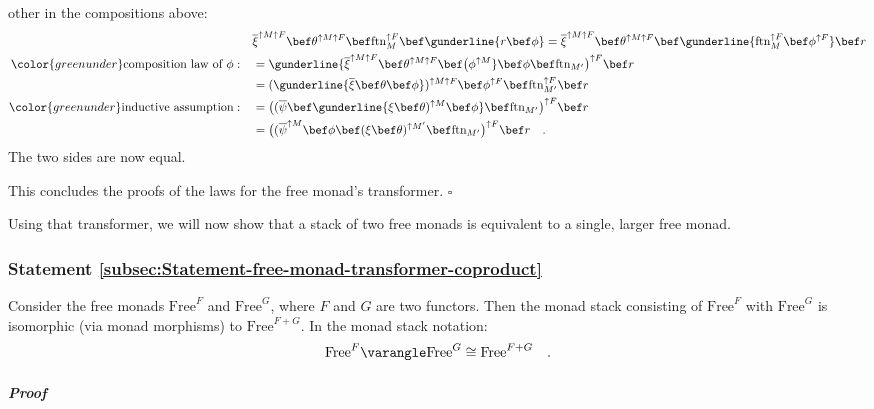 other in the compositions above:
\begin{align*}
 & \overline{\xi}^{\uparrow M\uparrow F}\bef\theta^{\uparrow M\uparrow F}\bef\text{ftn}_{M}^{\uparrow F}\bef\gunderline{r\bef\phi}=\overline{\xi}^{\uparrow M\uparrow F}\bef\theta^{\uparrow M\uparrow F}\bef\gunderline{\text{ftn}_{M}^{\uparrow F}\bef\phi^{\uparrow F}}\bef r\\
{\color{greenunder}\text{composition law of }\phi:}\quad & =\gunderline{\overline{\xi}^{\uparrow M\uparrow F}\bef\theta^{\uparrow M\uparrow F}\bef\big(\phi^{\uparrow M}}\bef\phi\bef\text{ftn}_{M^{\prime}}\big)^{\uparrow F}\bef r\\
 & =(\gunderline{\overline{\xi}\bef\theta\bef\phi})^{\uparrow M\uparrow F}\bef\phi^{\uparrow F}\bef\text{ftn}_{M^{\prime}}^{\uparrow F}\bef r\\
{\color{greenunder}\text{inductive assumption}:}\quad & =\big((\overline{\psi}\bef\gunderline{\xi\bef\theta)^{\uparrow M}\bef\phi}\bef\text{ftn}_{M^{\prime}}\big)^{\uparrow F}\bef r\\
 & =\big((\overline{\psi}^{\uparrow M}\bef\phi\bef(\xi\bef\theta)^{\uparrow M^{\prime}}\bef\text{ftn}_{M^{\prime}}\big)^{\uparrow F}\bef r\quad.
\end{align*}
The two sides are now equal.

This concludes the proofs of the laws for the free monad\textsf{'}s transformer.
$\square$

Using that transformer, we will now show that a stack of two free
monads is equivalent to a single, larger free monad.

\subsubsection{Statement \label{subsec:Statement-free-monad-transformer-coproduct}\ref{subsec:Statement-free-monad-transformer-coproduct}}

Consider the free monads $\text{Free}^{F}$ and $\text{Free}^{G}$,
where $F$ and $G$ are two functors. Then the monad stack consisting
of $\text{Free}^{F}$ with $\text{Free}^{G}$ is isomorphic (via monad
morphisms) to $\text{Free}^{F+G}$. In the monad stack notation:
\[
\text{Free}^{F}\varangle\text{Free}^{G}\cong\text{Free}^{F+G}\quad.
\]


\subparagraph{Proof}

